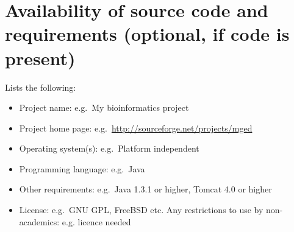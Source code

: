 \documentclass[a4paper,num-refs]{oup-contemporary}
\begin{document}



\section{Availability of source code and requirements (optional, if code is present)}

Lists the following:
\begin{itemize}
\item Project name: e.g.~My bioinformatics project
\item Project home page: e.g.~\url{http://sourceforge.net/projects/mged}
\item Operating system(s): e.g.~Platform independent
\item Programming language: e.g.~Java
\item Other requirements: e.g.~Java 1.3.1 or higher, Tomcat 4.0 or higher
\item License: e.g.~GNU GPL, FreeBSD etc.
Any restrictions to use by non-academics: e.g. licence needed
\end{itemize}
\end{document}
